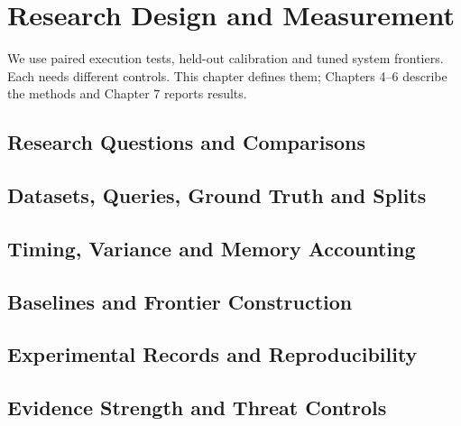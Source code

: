 \chapter{Research Design and Measurement}
\label{ch:methodology}
We use paired execution tests, held-out calibration and tuned system frontiers. Each needs different controls. This chapter defines them; Chapters 4--6 describe the methods and Chapter 7 reports results.

\section{Research Questions and Comparisons}
\label{sec:3-1}


\section{Datasets, Queries, Ground Truth and Splits}
\label{sec:3-2}


\section{Timing, Variance and Memory Accounting}
\label{sec:3-3}


\section{Baselines and Frontier Construction}
\label{sec:3-4}


\section{Experimental Records and Reproducibility}
\label{sec:3-5}


\section{Evidence Strength and Threat Controls}
\label{sec:3-6}

